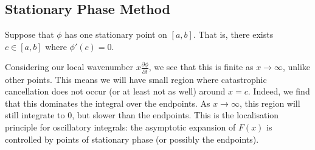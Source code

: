 \documentclass[../Main.tex]{subfiles}
\begin{document}
\subsection{Stationary Phase Method}
Suppose that $\phi$ has one stationary point on $[a, b]$. That is, there exists $c \in [a, b]$ where $\phi'(c) = 0$.

Considering our local wavenumber $x \frac{\partial \phi}{\partial t}$, we see that this is finite as $x\to \infty$, unlike other points. This means we will have small region where catastrophic cancellation does not occur (or at least not as well) around $x = c$. Indeed, we find that this dominates the integral over the endpoints. As $x \to \infty$, this region will still integrate to $0$, but slower than the endpoints. This is the localisation principle for oscillatory integrals: the asymptotic expansion of $F(x)$ is controlled by points of stationary phase (or possibly the endpoints).
\end{document}
